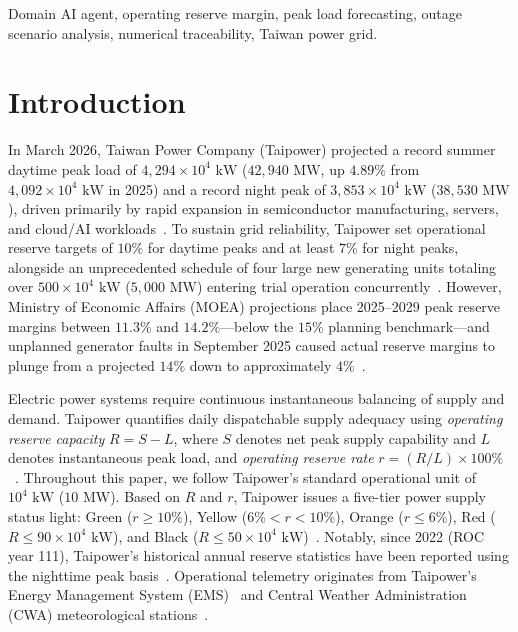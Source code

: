 \documentclass[conference]{IEEEtran}
\begin{document}
\begin{IEEEkeywords}
Domain AI agent, operating reserve margin, peak load forecasting, outage scenario analysis, numerical traceability, Taiwan power grid.
\end{IEEEkeywords}

\section{Introduction}
\label{sec:introduction}

In March 2026, Taiwan Power Company (Taipower) projected a record summer daytime peak load of $4{,}294 \times 10^4\text{ kW}$ ($42{,}940\text{ MW}$, up $4.89\%$ from $4{,}092 \times 10^4\text{ kW}$ in 2025) and a record night peak of $3{,}853 \times 10^4\text{ kW}$ ($38{,}530\text{ MW}$), driven primarily by rapid expansion in semiconductor manufacturing, servers, and cloud/AI workloads~\cite{ref7}. To sustain grid reliability, Taipower set operational reserve targets of $10\%$ for daytime peaks and at least $7\%$ for night peaks, alongside an unprecedented schedule of four large new generating units totaling over $500 \times 10^4\text{ kW}$ ($5{,}000\text{ MW}$) entering trial operation concurrently~\cite{ref7,ref8}. However, Ministry of Economic Affairs (MOEA) projections place 2025--2029 peak reserve margins between $11.3\%$ and $14.2\%$---below the $15\%$ planning benchmark---and unplanned generator faults in September 2025 caused actual reserve margins to plunge from a projected $14\%$ down to approximately $4\%$~\cite{ref9}.

Electric power systems require continuous instantaneous balancing of supply and demand. Taipower quantifies daily dispatchable supply adequacy using \textit{operating reserve capacity} $R = S - L$, where $S$ denotes net peak supply capability and $L$ denotes instantaneous peak load, and \textit{operating reserve rate} $r = (R / L) \times 100\%$~\cite{ref11}. Throughout this paper, we follow Taipower's standard operational unit of $10^4\text{ kW}$ ($10\text{ MW}$). Based on $R$ and $r$, Taipower issues a five-tier power supply status light: Green ($r \ge 10\%$), Yellow ($6\% < r < 10\%$), Orange ($r \le 6\%$), Red ($R \le 90 \times 10^4\text{ kW}$), and Black ($R \le 50 \times 10^4\text{ kW}$)~\cite{ref11}. Notably, since 2022 (ROC year 111), Taipower's historical annual reserve statistics have been reported using the nighttime peak basis~\cite{ref4}. Operational telemetry originates from Taipower's Energy Management System (EMS)~\cite{ref30} and Central Weather Administration (CWA) meteorological stations~\cite{ref6}.
\end{document}
